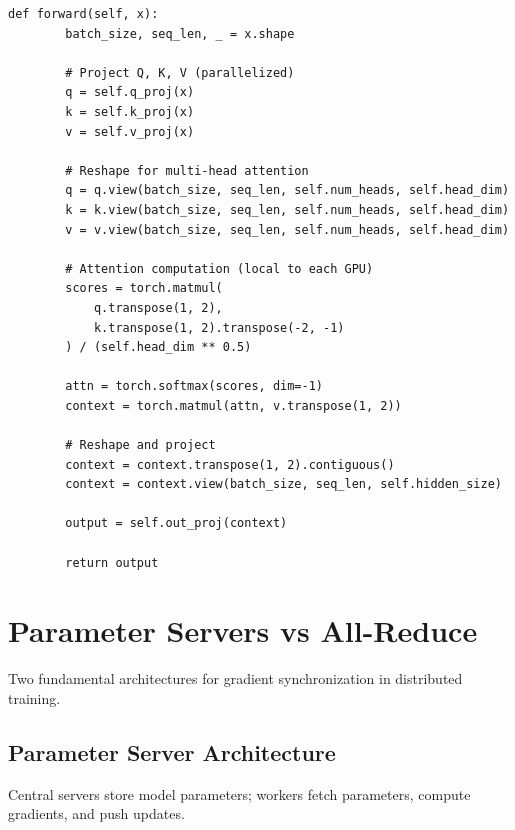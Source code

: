 \begin{lstlisting}[style=python, caption=Tensor parallelism for transformer layers]
    def forward(self, x):
        batch_size, seq_len, _ = x.shape

        # Project Q, K, V (parallelized)
        q = self.q_proj(x)
        k = self.k_proj(x)
        v = self.v_proj(x)

        # Reshape for multi-head attention
        q = q.view(batch_size, seq_len, self.num_heads, self.head_dim)
        k = k.view(batch_size, seq_len, self.num_heads, self.head_dim)
        v = v.view(batch_size, seq_len, self.num_heads, self.head_dim)

        # Attention computation (local to each GPU)
        scores = torch.matmul(
            q.transpose(1, 2),
            k.transpose(1, 2).transpose(-2, -1)
        ) / (self.head_dim ** 0.5)

        attn = torch.softmax(scores, dim=-1)
        context = torch.matmul(attn, v.transpose(1, 2))

        # Reshape and project
        context = context.transpose(1, 2).contiguous()
        context = context.view(batch_size, seq_len, self.hidden_size)

        output = self.out_proj(context)

        return output
\end{lstlisting}

\section{Parameter Servers vs All-Reduce}

Two fundamental architectures for gradient synchronization in distributed training.

\subsection{Parameter Server Architecture}

Central servers store model parameters; workers fetch parameters, compute gradients, and push updates.

